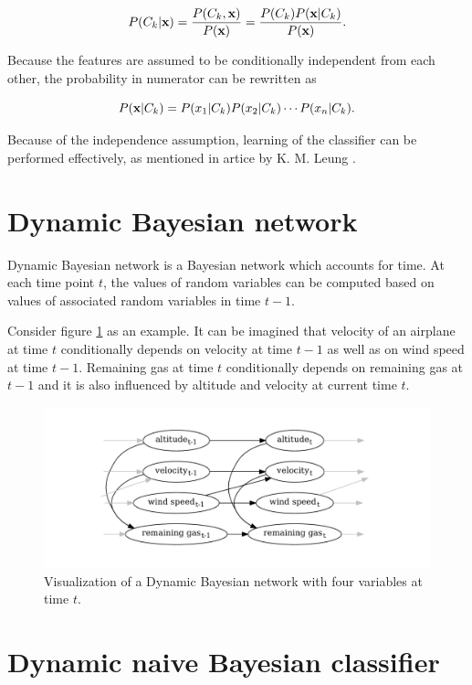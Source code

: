 \documentclass[thesis=B,english]{FITthesis}[2012/06/26]
\begin{document}
\begin{equation}
P(C_k | \textbf x) = \frac{P(C_k,\textbf x)}{P(\textbf x)} = \frac{P(C_k) P(\textbf x | C_k)}{P(\textbf x)}.
\end{equation}

Because the features are assumed to be conditionally independent from each other, the probability in numerator can be rewritten as

\begin{equation}
P(\textbf x | C_k) = P(x_1|C_k) P(x_2|C_k) \cdots P(x_n|C_k).
\end{equation}

Because of the independence assumption, learning of the classifier can be performed effectively, as mentioned in artice by K. M. Leung \cite{naive-bayesian-classifier}.

\section{Dynamic Bayesian network}

Dynamic Bayesian network is a Bayesian network which accounts for time. At each time point $t$, the values of random variables can be computed based on values of associated random variables in time $t-1$.

Consider figure \ref{fig:dbn} as an example. It can be imagined that velocity of an airplane at time $t$ conditionally depends on velocity at time $t-1$ as well as on wind speed at time $t-1$. Remaining gas at time $t$ conditionally depends on remaining gas at $t-1$ and it is also influenced by altitude and velocity at current time $t$.

\begin{figure}
	\centering
 	\includegraphics[width=1\textwidth]{dbn}
 	\caption{Visualization of a Dynamic Bayesian network with four variables at time $t$.}
 	\label{fig:dbn}
\end{figure}

\section{Dynamic naive Bayesian classifier}
\end{document}
